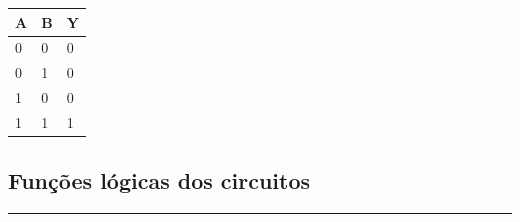 \documentclass[12pt]{article}
\begin{document}
\begin{center}
\begin{table}[H]
\begin{minipage}{.20\linewidth}
\begin{tabular}{|l|l|l|}
\end{tabular}
\end{minipage}%
\hfill
\begin{minipage}{.20\linewidth}
\centering
{}
\begin{tabular}{|l|l|l|}
\hline
\rowcolor{lightgray}A & B & Y \\ \hline
0 & 0 & \cellcolor{red}0 \\ \hline
0 & 1 & \cellcolor{red}0 \\ \hline
1 & 0 & \cellcolor{red}0 \\ \hline
1 & 1 & \cellcolor{green}1 \\ \hline
\end{tabular}
\end{minipage}
\end{table}
\end{center}

\newpage
\subsection{Funções lógicas dos circuitos}
\noindent\rule[1.2cm]{3.35in}{.1mm}
\vspace{-0.5cm}
\end{document}

